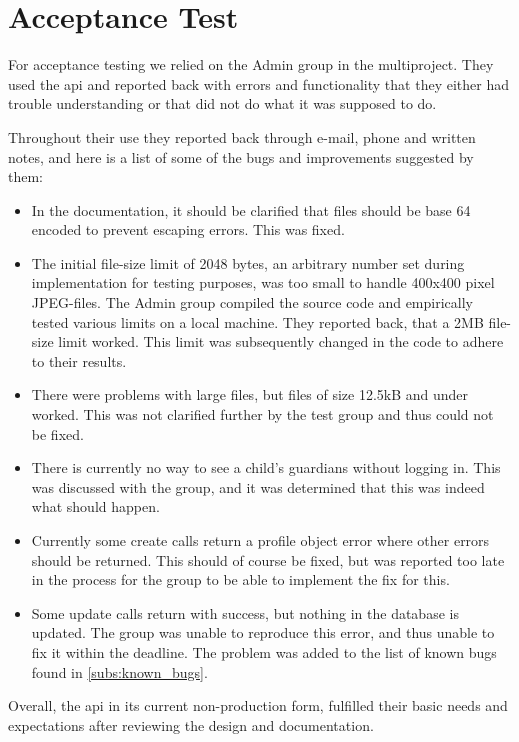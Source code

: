 \section{Acceptance Test}
For acceptance testing we relied on the Admin group in the multiproject. They used the \ac{api} and reported back with errors and functionality that they either had trouble understanding or that did not do what it was supposed to do. 

Throughout their use they reported back through e-mail, phone and written notes, and here is a list of some of the bugs and improvements suggested by them:

\begin{itemize}
\item In the documentation, it should be clarified that files should be base 64 encoded to prevent escaping errors. This was fixed.
\item The initial file-size limit of 2048 bytes, an arbitrary number set during implementation for testing purposes, was too small to handle 400x400 pixel JPEG-files. The Admin group compiled the source code and empirically tested various limits on a local machine. They reported back, that a 2MB file-size limit worked. This limit was subsequently changed in the code to adhere to their results.
\item There were problems with large files, but files of size 12.5kB and under worked. This was not clarified further by the test group and thus could not be fixed.
\item There is currently no way to see a child's guardians without logging in. This was discussed with the group, and it was determined that this was indeed what should happen.
\item Currently some create calls return a profile object error where other errors should be returned. This should of course be fixed, but was reported too late in the process for the group to be able to implement the fix for this.
\item Some update calls return with success, but nothing in the database is updated. The group was unable to reproduce this error, and thus unable to fix it within the deadline. The problem was added to the list of known bugs found in \autoref{subs:known_bugs}.
\end{itemize}

Overall, the \ac{api} in its current non-production form, fulfilled their basic needs and expectations after reviewing the design and documentation.